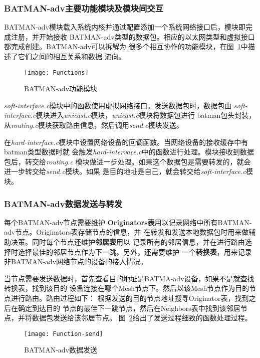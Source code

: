 \subsubsection{BATMAN-adv主要功能模块及模块间交互}
BATMAN-adv模块载入系统内核并通过配置添加一个系统网络接口后，模块即完成注册，并开始接收
BATMAN-adv类型的数据包。相应的以太网类型和虚拟接口都完成创建。BATMAN-adv可以拆解为
很多个相互协作的功能模块，在图~\ref{fig:functions}中描述了它们之间的相互关系和数据
流向。
\begin{figure}[H] %
  \centering
  \texttt{[image: Functions]}
  \caption{BATMAN-adv功能模块}
  \label{fig:functions}
\end{figure}

\emph{soft-interface.c}模块中的函数使用虚拟网络接口。发送数据包时，数据包由
\emph{soft-interface.c}模块进入\emph{unicast.c}模块，\emph{unicast.c}模块将数据包进行
batman包头封装，从\emph{routing.c}模块获取路由信息，然后调用\emph{send.c}模块发送。

在\emph{hard-interface.c}模块中设置网络设备的回调函数。当网络设备的接收缓存中有batman类型数据时就
会触发\emph{hard-intervace.c}中的函数进行处理。模块接收到数据包后，转交给\emph{routing.c}
模块做进一步处理。如果这个数据包是需要转发的，就会进一步转交给\emph{send.c}模块。如果
是目的地址是自己，就会转交给\emph{soft-interface.c}模块。

\subsubsection{BATMAN-adv数据发送与转发}
每个BATMAN-adv节点需要维护
\textbf{Originators表}用以记录网络中所有BATMAN-adv节点。Originators表存储节点的信息，并
在转发和发送本地数据包时用来做辅助决策。同时每个节点还维护\textbf{邻居表}用以
记录所有的邻居信息，并在进行路由选择时选择最佳的邻居节点作为下一跳。另外，还需要维护
一个\textbf{转换表}，用来记录非BATMAN-adv网络节点的设备的接入情况。

当节点需要发送数据时，首先查看目的地址是BATMA-adv设备，如果不是就查找转换表，找到该目的
设备连接在哪个Mesh节点下。然后以该Mesh节点作为目的节点进行路由。路由过程如下：
根据发送的目的节点地址搜寻Originator表，找到之后在确定到达目的
节点的最佳下一跳节点，然后在Neighbors表中找到该邻居节点，并将数据包发送给该邻居节点。
图~\ref{fig:function-send}给出了发送过程细致的函数处理过程。
\begin{figure}[H] %
  \centering
  \texttt{[image: Function-send]}
  \caption{BATMAN-adv数据发送}
  \label{fig:function-send}
\end{figure}

